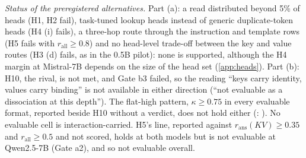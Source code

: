 \begin{table}[p]
\centering
\footnotesize
\caption{\textbf{Preregistration H.} GPU stage 6, scored by \texttt{analysis/stage6\_score.py}. Predictions, gates, scoring script and code were finalised at \texttt{cc3a3e0}, before any stage-6 run and before any output of G was inspected; the run used that commit. Part (a), gates a1--a3 and H1--H6: Qwen2.5-7B / Mistral-7B (Instruct), \fmtOpt{} unless stated, BF16, eager attention, 60 ranking and 60 held-out evaluation stories, $k^*$ = 5\% of heads; a prediction over both models is met only if it is met in both. Part (b), gates b0--b3 and H7--H12: Qwen2.5-14B-Instruct on the material of \citet{prakash2025lookbacks}, $n = \PkN{}$ pairs, BF16; triples are \fmtNone{} / \textsc{qnames} / \fmtOpt{}; $\ell^* = \PkLstar{}$, $\ell^*_{\mathrm{ID}} = \PkLstarId{}$. met$^*$: met except in the cell named in the Observed column. 95\% bootstrap CIs (10{,}000 resamples). In all, \HcountMet{} met (H1--H5, H11), \HcountNotMet{} not met (H7--H10), \HcountNotEval{} not evaluable (H6) and \HcountNotRun{} not run (H12). Details in \cref{app:stage6}.}
\label{tab:prereg-h}


\smallskip
\begin{minipage}{0.94\textwidth}
\footnotesize
\emph{Status of the preregistered alternatives.} Part (a): a read distributed beyond 5\% of heads (H1, H2 fail), task-tuned lookup heads instead of generic duplicate-token heads (H4 (i) fails), a three-hop route through the instruction and template rows (H5 fails with $r_{\mathrm{all}} \geq 0.8$) and no head-level trade-off between the key and value routes (H3 (d) fails, as in the 0.5B pilot): none is supported, although the H4 margin at Mistral-7B depends on the size of the head set (\cref{app:heads}). Part (b): H10, the rival, is not met, and Gate b3 failed, so the reading ``keys carry identity, values carry binding'' is not available in either direction (``not evaluable as a dissociation at this depth''). The flat-high pattern, $\kappa \geq 0.75$ in every evaluable format, reported beside H10 without a verdict, does not hold either (\fmtNone{}: \PkKappaBindNone{}). No evaluable cell is interaction-carried. H5's \fmtPost{} line, reported against $r_{\mathrm{ans}}(KV) \geq 0.35$ and $r_{\mathrm{all}} \geq 0.5$ and not scored, holds at both models but is not evaluable at Qwen2.5-7B (Gate a2), and so not evaluable overall.
\end{minipage}
\end{table}

